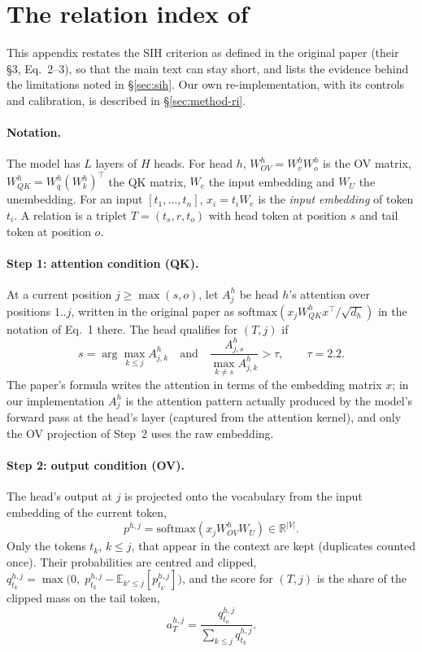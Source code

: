 \section{The relation index of
\texorpdfstring{\citet{ren2024semantic}}{Ren et al. (2024)}}
\label{app:ri}

This appendix restates the SIH criterion as defined in the original paper (their
\S3, Eq.~2--3), so that the main text can stay short, and lists the evidence behind
the limitations noted in \S\ref{sec:sih}. Our own re-implementation, with its
controls and calibration, is described in \S\ref{sec:method-ri}.

\paragraph{Notation.}
The model has $L$ layers of $H$ heads. For head $h$, $W^h_{OV}=W^h_v W^h_o$ is the OV
matrix, $W^h_{QK}=W^h_q (W^h_k)^{\top}$ the QK matrix, $W_e$ the input embedding and
$W_U$ the unembedding. For an input $[t_1,\ldots,t_n]$, $x_i=t_i W_e$ is the
\emph{input embedding} of token $t_i$. A relation is a triplet $T=(t_s,r,t_o)$ with
head token at position $s$ and tail token at position $o$.

\paragraph{Step 1: attention condition (QK).}
At a current position $j\ge\max(s,o)$, let $A^h_j$ be head $h$'s attention over
positions $1..j$, written in the original paper as $\mathrm{softmax}(x_j W^h_{QK}
x^{\top}/\sqrt{d_h})$ in the notation of Eq.~1 there. The head qualifies for $(T,j)$
if
\begin{equation*}
s=\arg\max_{k\le j} A^h_{j,k}
\quad\text{and}\quad
\frac{A^h_{j,s}}{\max_{k\ne s} A^h_{j,k}}>\tau,\qquad \tau=2.2 .
\end{equation*}
The paper's formula writes the attention in terms of the embedding matrix $x$; in our
implementation $A^h_j$ is the attention pattern actually produced by the model's
forward pass at the head's layer (captured from the attention kernel), and only the
OV projection of Step~2 uses the raw embedding.

\paragraph{Step 2: output condition (OV).}
The head's output at $j$ is projected onto the vocabulary from the input embedding of
the current token,
\begin{equation*}
p^{h,j}=\mathrm{softmax}\!\left(x_j W^h_{OV} W_U\right)\in\mathbb{R}^{|V|}.
\end{equation*}
Only the tokens $t_k$, $k\le j$, that appear in the context are kept (duplicates
counted once). Their probabilities are centred and clipped,
$q^{h,j}_{t_k}=\max\!\big(0,\;p^{h,j}_{t_k}-\mathbb{E}_{k'\le j}[p^{h,j}_{t_{k'}}]\big)$,
and the score for $(T,j)$ is the share of the clipped mass on the tail token,
\begin{equation*}
a^{h,j}_T=\frac{q^{h,j}_{t_o}}{\sum_{k\le j} q^{h,j}_{t_k}} .
\end{equation*}

